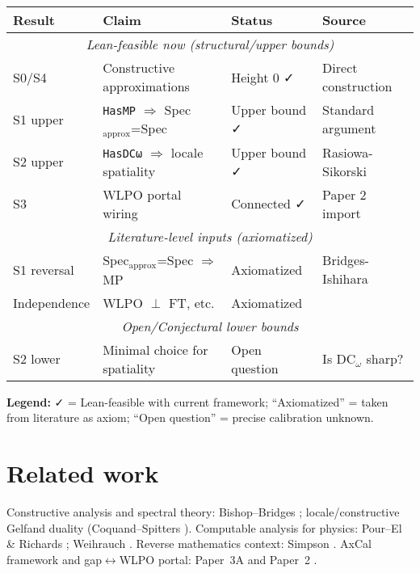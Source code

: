 \documentclass[11pt]{article}
\theoremstyle{plain}
\theoremstyle{definition}
\theoremstyle{remark}
\begin{document}
\begin{center}
\begin{tabular}{|l|p{5cm}|p{3.5cm}|p{3cm}|}
\hline
\textbf{Result} & \textbf{Claim} & \textbf{Status} & \textbf{Source} \\
\hline
\multicolumn{4}{|c|}{\textit{Lean-feasible now (structural/upper bounds)}} \\
\hline
S0/S4 & Constructive approximations & Height 0 ✓ & Direct construction \\
\hline
S1 upper & \texttt{HasMP} $\Rightarrow$ Spec$_{\text{approx}}$=Spec & Upper bound ✓ & Standard argument \\
\hline
S2 upper & \texttt{HasDCω} $\Rightarrow$ locale spatiality & Upper bound ✓ & Rasiowa-Sikorski \\
\hline
S3 & WLPO portal wiring & Connected ✓ & Paper 2 import \\
\hline
\multicolumn{4}{|c|}{\textit{Literature-level inputs (axiomatized)}} \\
\hline
S1 reversal & Spec$_{\text{approx}}$=Spec $\Rightarrow$ MP & Axiomatized & Bridges-Ishihara \cite{BridgesRichman} \\
\hline
Independence & WLPO $\perp$ FT, etc. & Axiomatized & \cite{Simpson, Ishihara06} \\
\hline
\multicolumn{4}{|c|}{\textit{Open/Conjectural lower bounds}} \\
\hline
S2 lower & Minimal choice for spatiality & Open question & Is DC$_\omega$ sharp? \\
\hline
\end{tabular}
\end{center}

\noindent\textbf{Legend:} ✓ = Lean-feasible with current framework; ``Axiomatized'' = taken from literature as axiom; ``Open question'' = precise calibration unknown.

\section{Related work}

Constructive analysis and spectral theory: Bishop--Bridges \cite{BishopBridges}; locale/constructive Gelfand duality (Coquand--Spitters \cite{CoquandSpitters}).
Computable analysis for physics: Pour--El \& Richards \cite{PourElRichards}; Weihrauch \cite{Weihrauch}. Reverse mathematics context: Simpson \cite{Simpson}.
AxCal framework and gap$\leftrightarrow$WLPO portal: Paper~3A \cite{Paper3A} and Paper~2 \cite{Paper2}.
\end{document}
